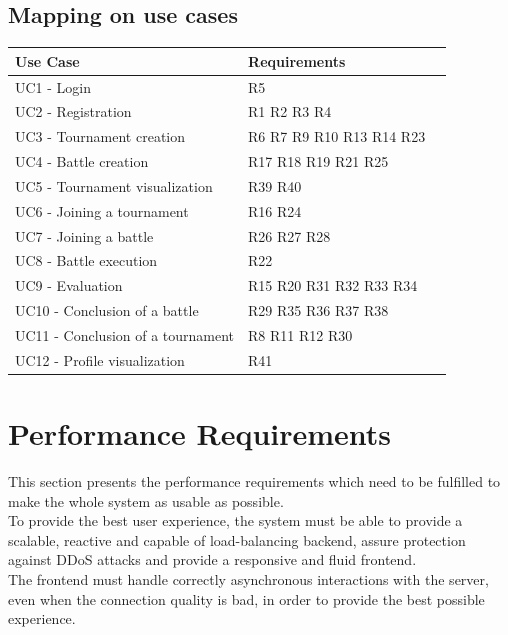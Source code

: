 \clearpage
\subsection{Mapping on use cases}
\begin{table}[H]
    \begin{tabularx}{\textwidth}{XXX}
        \toprule
        \textbf{Use Case}                     & \textbf{Requirements} \\ \midrule
        UC1 - Login                           & R5                   \\
        UC2 - Registration                    & R1 R2 R3 R4               \\
        UC3 - Tournament creation             & R6 R7 R9 R10 R13 R14 R23  \\
        UC4 - Battle creation                 & R17 R18 R19 R21 R25       \\
        UC5 - Tournament visualization        & R39 R40          \\
        UC6 - Joining a tournament            & R16 R24          \\
        UC7 - Joining a battle                & R26 R27 R28      \\
        UC8 - Battle execution                & R22              \\
        UC9 - Evaluation                      & R15 R20 R31 R32 R33 R34     \\
        UC10 - Conclusion of a battle         & R29 R35 R36 R37 R38         \\
        UC11 - Conclusion of a tournament     & R8 R11 R12 R30              \\
        UC12 - Profile visualization          & R41              \\
        \bottomrule
    \end{tabularx}
\end{table}

\clearpage
\section{Performance Requirements}
This section presents the performance requirements which need to be fulfilled to make the
whole system as usable as possible.\\
To provide the best user experience, the system must be able to provide a scalable, reactive 
and capable of load-balancing backend, assure protection against DDoS attacks and provide a 
responsive and fluid frontend.\\
The frontend must handle correctly asynchronous interactions with the server, even when the 
connection quality is bad, in order to provide the best possible experience.\\

